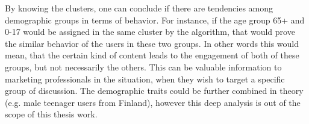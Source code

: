     By knowing the clusters, one can conclude if there are tendencies among demographic groups in terms of behavior. For instance, if the age group 65+ and 0-17 would be assigned in the same cluster by the algorithm, that would prove the similar behavior of the users in these two groups. In other words this would mean, that the certain kind of content leads to the engagement of both of these groups, but not necessarily the others. This can be valuable information to marketing professionals in the situation, when they wish to target a specific group of discussion. The demographic traits could be further combined in theory (e.g. male teenager users from Finland), however this deep analysis is out of the scope of this thesis work. 